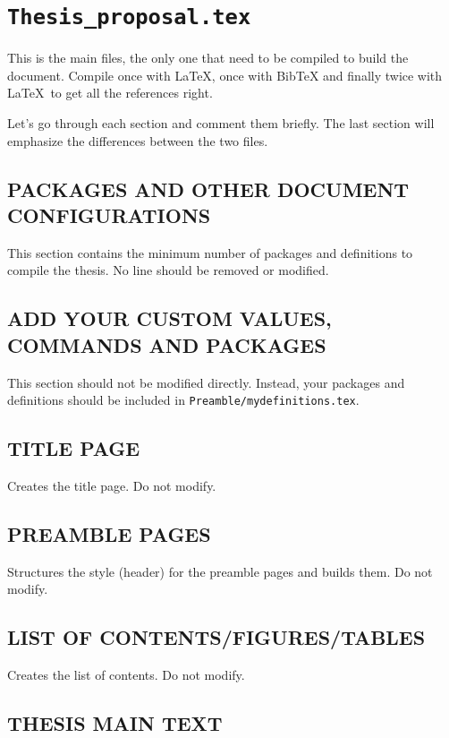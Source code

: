 \section{\texttt{Thesis\_proposal.tex}}

This is the main files, the only one that need to be compiled to build the document. Compile once with \LaTeX, once with BibTeX and finally twice with \LaTeX\ to get all the references right.

Let's go through each section and comment them briefly. The last section will emphasize the differences between the two files.

\subsection{PACKAGES AND OTHER DOCUMENT CONFIGURATIONS}

This section contains the minimum number of packages and definitions to compile the thesis. No line should be removed or modified.

\subsection{ADD YOUR CUSTOM VALUES, COMMANDS AND PACKAGES}

This section should not be modified directly. Instead, your packages and definitions should be included in  \texttt{Preamble/mydefinitions.tex}.

\subsection{TITLE PAGE}

Creates the title page. Do not modify.

\subsection{PREAMBLE PAGES}

Structures the style (header) for the preamble pages and builds them. Do not modify.

\subsection{LIST OF CONTENTS/FIGURES/TABLES}

Creates the list of contents. Do not modify.

\subsection{THESIS MAIN TEXT}


